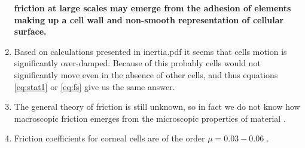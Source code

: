 \documentclass[10pt,a4paper]{article}
\begin{document}
\begin{enumerate}
 \textbf{friction at large scales may emerge from the adhesion of elements making up a cell wall and non-smooth representation of cellular surface.}
 \item Based on calculations presented in inertia.pdf it seems that cells motion is significantly over-damped.
 Because of this probably cells would not significantly move even in the absence of other cells, and thus equations \ref{eq:stat1} or  \ref{eq:fs} give us the same answer.
 \item The general theory of friction is still unknown, so in fact we do not know how macroscopic friction emerges from the microscopic properties of material \cite{kess01}.
 \item Friction coefficients for corneal cells are of the order $\mu=0.03-0.06$ \cite{ang12}.
\end{enumerate}




\thispagestyle{empty} %




\clearpage
\end{document}
